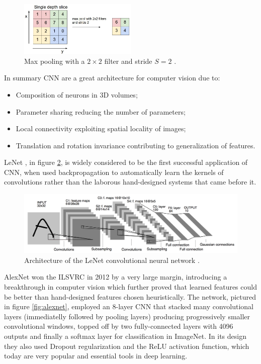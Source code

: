 \begin{figure}[ht]
    \centering
    \includegraphics[width=0.5\textwidth]{figs/maxpooling.png}
    \caption{Max pooling with a $2 \times 2$ filter and stride $S = 2$ \cite{cs231n}.}
    \label{fig:maxpooling}
\end{figure}

In summary \ac{CNN} are a great architecture for computer vision due to:

\begin{itemize}
    \item Composition of neurons in 3D volumes;
    \item Parameter sharing reducing the number of parameters;
    \item Local connectivity exploiting spatial locality of images;
    \item Translation and rotation invariance contributing to generalization of features.
\end{itemize}

LeNet \cite{lenet}, in figure \ref{fig:lenet}, is widely considered to be the first successful application of \ac{CNN}, when \citeauthor{lenet} used backpropagation to automatically learn the kernels of convolutions rather than the laborous hand-designed systems that came before it.

\begin{figure}[ht]
    \centering
    \includegraphics[width=1.0\textwidth]{figs/lenet.png}
    \caption{Architecture of the LeNet convolutional neural network \cite{lenet}.}
    \label{fig:lenet}
\end{figure}

AlexNet \cite{alexnet} won the \ac{ILSVRC} \cite{imagenet} in 2012 by a very large margin, introducing a breakthrough in computer vision which further proved that learned features could be better than hand-designed features chosen heuristically. The network, pictured in figure \ref{fig:alexnet}, employed an 8-layer \ac{CNN} that stacked many convolutional layers (immediatelly followed by pooling layers) producing progressively smaller convolutional windows, topped off by two fully-connected layers with 4096 outputs and finally a softmax layer for classification in ImageNet. In its design they also used Dropout regularization and the ReLU activation function, which today are very popular and essential tools in deep learning.

